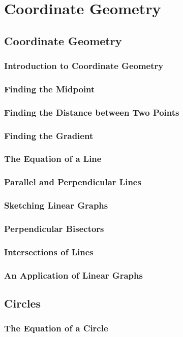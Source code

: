 \documentclass[../maths.tex]{subfiles}
\begin{document}
\chapter{Coordinate Geometry}
\section{Coordinate Geometry}
\subsection*{Introduction to Coordinate Geometry}
\subsection*{Finding the Midpoint}
\subsection*{Finding the Distance between Two Points}
\subsection*{Finding the Gradient}
\subsection*{The Equation of a Line}
\subsection*{Parallel and Perpendicular Lines}
\subsection*{Sketching Linear Graphs}
\subsection*{Perpendicular Bisectors}
\subsection*{Intersections of Lines}
\subsection*{An Application of Linear Graphs}
\section{Circles}
\subsection*{The Equation of a Circle}
\end{document}

